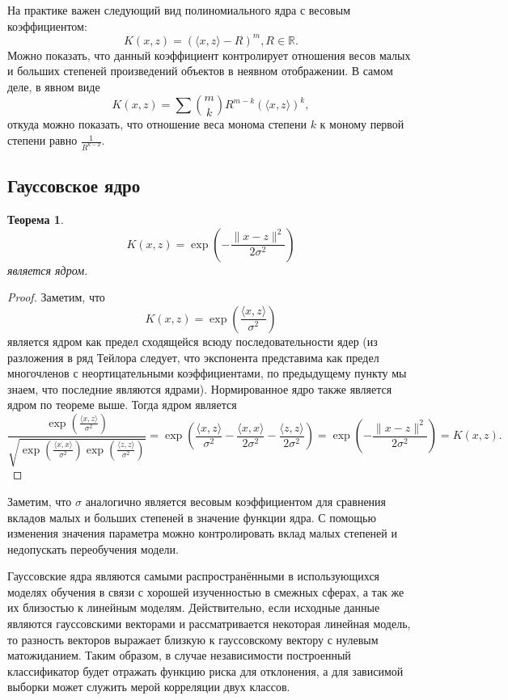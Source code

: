 \documentclass[twoside,twocolumn]{article}
\theoremstyle{plain}
\newtheorem{theorem}{Теорема}
\theoremstyle{definition}
\begin{document}
На практике важен следующий вид полиномиального ядра с весовым коэффициентом:
\[K(x, z) = (\langle x, z \rangle - R)^m, R \in \mathbb{R}.\]
Можно показать, что данный коэффициент контролирует отношения весов малых и больших степеней произведений объектов в неявном отображении. В самом деле, в явном виде
\[K(x, z) = \sum \binom{m}{k}R^{m - k}(\langle x, z \rangle)^k,\]
откуда можно показать, что отношение веса монома степени $k$ к моному первой степени равно $\frac{1}{R^{k - 2}}$.

\subsection{Гауссовское ядро}
\begin{theorem}
\[K(x, z) = \exp{\left(- \frac{\|x - z\|^2}{2\sigma^2}\right)}\]
является ядром.
\end{theorem}
\begin{proof}
Заметим, что \[K(x, z) = \exp{\left(\frac{\langle x, z \rangle}{\sigma^2}\right)}\] является ядром как предел сходящейся всюду последовательности ядер (из разложения в ряд Тейлора следует, что экспонента представима как предел многочленов с неортицательными коэффициентами, по предыдущему пункту мы знаем, что последние являются ядрами). Нормированное ядро также является ядром по теореме выше. 
Тогда ядром является
\[\frac{\exp{(\frac{\langle x, z \rangle}{\sigma^2})}}{\sqrt{\exp{(\frac{\langle x, x \rangle}{\sigma^2})}\exp{(\frac{\langle z, z \rangle}{\sigma^2})}}}

 = \exp{\left( \frac{\langle x, z \rangle}{\sigma^2} - \frac{\langle x, x \rangle}{2\sigma^2} - \frac{\langle z, z \rangle}{2\sigma^2}\right)} = \exp{\left(- \frac{\|x - z\|^2}{2\sigma^2}\right)} = K(x, z).\]
\end{proof}
Заметим, что $\sigma$ аналогично является весовым коэффициентом для сравнения вкладов малых и больших степеней в значение функции ядра. С помощью изменения значения параметра можно контролировать вклад малых степеней и недопускать переобучения модели. \par
Гауссовские ядра являются самыми распространёнными в использующихся моделях обучения в связи с хорошей изученностью в смежных сферах, а так же их близостью к линейным моделям. Действительно, если исходные данные являются гауссовскими векторами и рассматривается некоторая линейная модель, то разность векторов выражает близкую к гауссовскому вектору с нулевым матожиданием. Таким образом, в случае независимости построенный классификатор будет отражать функцию риска для отклонения, а для зависимой выборки может служить мерой корреляции двух классов.
\end{document}
